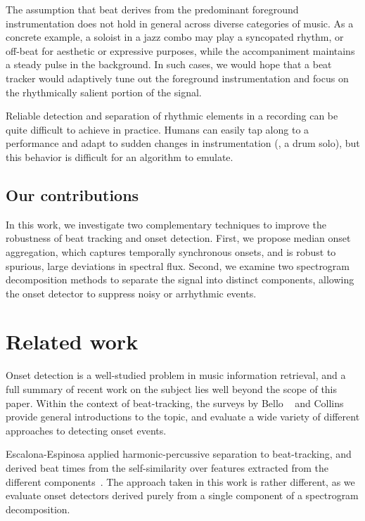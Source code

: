 \documentclass{article}
\begin{document}
The assumption that beat derives from the predominant foreground instrumentation does not 
hold in general across diverse categories of music. As a concrete example, a soloist in a 
jazz combo may play a syncopated rhythm, or off-beat for aesthetic or expressive purposes, 
while the accompaniment maintains a steady pulse in the background.  
In such cases, we would hope that a beat tracker would adaptively tune out the foreground 
instrumentation and focus on the rhythmically salient portion of the signal.

Reliable detection and separation of rhythmic elements in a recording can be quite
difficult to achieve in practice.  Humans can easily tap along to a
performance and adapt to sudden changes in instrumentation (\eg, a drum solo), but 
this behavior is difficult for an algorithm to emulate.

\subsection{Our contributions}
In this work, we investigate two complementary techniques to improve the robustness of 
beat tracking and onset detection. 
First, we propose median onset aggregation, which captures temporally synchronous onsets, and is robust to spurious, large deviations in spectral flux.
Second, we examine two spectrogram decomposition methods to separate the signal into distinct components, allowing the onset detector to suppress noisy or arrhythmic events. 

\section{Related work}
\label{sec:related}
Onset detection is a well-studied problem in music information retrieval, and a full
summary of recent work on the subject lies well beyond the scope of this paper.
Within the context of beat-tracking, the surveys by Bello \etal~\cite{bello2005tutorial}
and Collins~\cite{collins2005comparison} provide general introductions to the topic, and
evaluate a wide variety of different approaches to detecting onset events.  

Escalona-Espinosa applied harmonic-percussive separation to beat-tracking, and derived beat 
times from the self-similarity over features extracted from the different 
components~\cite{escalona2008downbeat}.  The approach taken in this work is rather
different, as we evaluate onset detectors derived purely from a single component of a
spectrogram decomposition.
\end{document}
